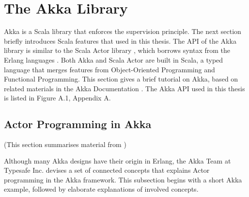 \section{The Akka Library}
\label{akka_lib}

Akka is a Scala library that enforces the supervision principle.  The next section briefly
introduces Scala features that used in this thesis.  The API of the 
Akka library \citep{akka_api, akka_doc} is similar to the Scala 
Actor library \citep{actor_1, actor_2}, which borrows syntax from the Erlang 
languages \citep{ArmstrongErlang, ErlangManual}.  Both Akka and Scala Actor are 
built in Scala, a typed language that merges features from Object-Oriented 
Programming and Functional Programming.  This section gives a brief tutorial 
on Akka, based on related materials in the Akka Documentation 
\citep{akka_doc}.  The Akka API used in this thesis is listed in Figure A.1, Appendix A.


\subsection{Actor Programming in Akka}
\label{subsection:actor_akka}

(This section summarises material from \citep[Section 2.3 and 3.1]{akka_doc})
\vspace{12 pt}

Although many Akka designs have their origin in Erlang, the Akka Team at 
Typesafe Inc. devises a set of connected concepts that explains Actor 
programming in the Akka framework.  This subsection begins with a short Akka 
example, followed by elaborate explanations of involved concepts.



